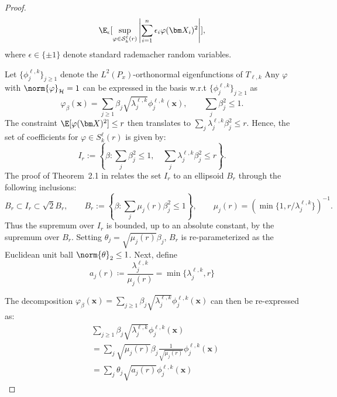 \begin{proof}
\begin{equation}
 \E_\epsilon[\sup_{\varphi\in\mathcal S^\ell_k(r)}
    \left|
        \sum_{i=1}^n\epsilon_i\varphi(\bm X_i)^2
        \right|],
\end{equation}
where $\epsilon \in \{\pm 1\}$ denote standard rademacher random variables.

Let
\(\{\phi_j^{\ell,k}\}_{j\ge1}\) denote the \(L^2(P_x)\)-orthonormal eigenfunctions
of \(T_{\ell,k}\) 
Any $\varphi$ with $\norm{\varphi}_{\mathcal{H}}=1$ can be expressed in the basis w.r.t \(\{\phi_j^{\ell,k}\}_{j\ge1}\)  as
\[
    \varphi_\beta(\bm x)
    =
    \sum_{j\ge1}
    \beta_j\sqrt{\lambda_j^{\ell,k}} 
    \phi_j^{\ell,k}(\bm x),
    \qquad
    \sum_j\beta_j^2\le 1.
\]
The constraint $\E[\varphi(\bm X)^2]\le r$ then translates to
\(\sum_j\lambda_j^{\ell,k}\beta_j^2\le r\). Hence, the set of coefficients for $\varphi \in S^\ell_k(r)$ is given by:
\[
    I_r
    :=
    \left\{
        \beta:
        \sum_j\beta_j^2\le 1,\quad
        \sum_j\lambda_j^{\ell,k}\beta_j^2\le r
    \right\}.
\]
The proof of Theorem~2.1 in 
\cite{mendelson2003performance} relates the set $I_r$ to an ellipsoid $B_r$ through the following inclusions:
\[
    B_r\subset I_r\subset \sqrt2 B_r,
    \qquad
    B_r
    :=
    \left\{\beta:\sum_j\mu_j(r)\beta_j^2\le1\right\},
    \qquad
    \mu_j(r)=\left(\min\{1,r/\lambda_j^{\ell,k}\}\right)^{-1}.
\]
Thus the supremum over \(I_r\) is bounded, up to an absolute constant, by the
supremum over \(B_r\). Setting \(\theta_j=\sqrt{\mu_j(r)} \beta_j\), 
\(B_r\) is re-parameterized as the Euclidean unit ball \(\norm{\theta}_2\le1\). Next, define
\[
    a_j(r) \coloneqq \frac{\lambda_j^{\ell,k}}{\mu_j(r)}
    =
    \min\{\lambda_j^{\ell,k},r\}
\]

The decomposition $\varphi_\beta(\bm x)
    =
    \sum_{j\ge1}
    \beta_j\sqrt{\lambda_j^{\ell,k}} 
    \phi_j^{\ell,k}(\bm x)$ can then be re-expressed as:
    \begin{align*}
         &\sum_{j\ge1}
    \beta_j\sqrt{\lambda_j^{\ell,k}} 
    \phi_j^{\ell,k}(\bm x)\\&= \sum_j
    \sqrt{\mu_j(r)} \beta_j \frac{1}{\sqrt{\mu_j(r)}}\phi_j^{\ell,k}(\bm x)\\&= \sum_j
            \theta_j\sqrt{a_j(r)}\phi_j^{\ell,k}(\bm x)
    \end{align*}


\end{proof}
